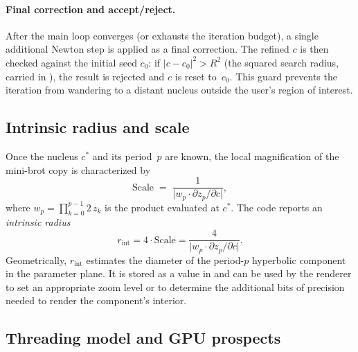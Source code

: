 \paragraph{Final correction and accept/reject.}
After the main loop converges (or exhausts the iteration budget), a single
additional Newton step is applied as a final correction.  The refined $c$ is
then checked against the initial seed $c_0$: if
$|c - c_0|^2 > R^2$ (the squared search radius, carried in ),
the result is rejected and $c$ is reset to~$c_0$.  This guard prevents the
iteration from wandering to a distant nucleus outside the user's region of
interest.

\subsection{Intrinsic radius and scale}
\label{subsec:ff-intrinsic-radius}

Once the nucleus $c^*$ and its period~$p$ are known, the local magnification
of the mini-brot copy is characterized by
\begin{equation}\label{eq:ff-scale}
\mathrm{Scale} \;=\;
  \frac{1}{\bigl|w_p \cdot \partial z_p/\partial c\bigr|},
\end{equation}
where $w_p = \prod_{k=0}^{p-1} 2\,z_k$ is the  product
evaluated at $c^*$.  The code reports an \emph{intrinsic radius}
\begin{equation}\label{eq:ff-intrinsic-radius}
r_{\mathrm{int}} = 4 \cdot \mathrm{Scale}
  = \frac{4}{\bigl|w_p \cdot \partial z_p/\partial c\bigr|}.
\end{equation}
Geometrically, $r_{\mathrm{int}}$ estimates the diameter of the
period-$p$ hyperbolic component in the parameter plane.  It is stored
as a  value in  and can be used by
the renderer to set an appropriate zoom level or to determine the additional
bits of precision needed to render the component's interior.

\subsection{Threading model and GPU prospects}
\label{subsec:ff-threading}

